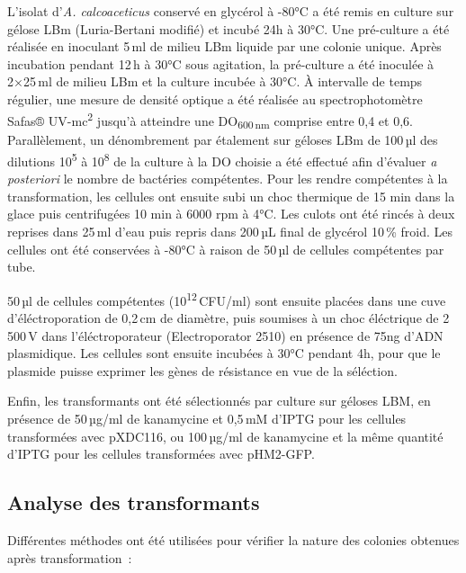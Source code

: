 L’isolat d’\textit{A. calcoaceticus} conservé en glycérol à -80°C a été remis en culture sur gélose LBm (Luria-Bertani modifié) et incubé 24h à 30°C.
Une pré-culture a été réalisée en inoculant 5\,ml de milieu LBm liquide par une colonie unique.
Après incubation pendant 12\,h à 30°C sous agitation, la pré-culture a été inoculée à 2×25\,ml de milieu LBm et la culture incubée à 30°C.
À intervalle de temps régulier, une mesure de densité optique a été réalisée au spectrophotomètre Safas® UV-mc\textsuperscript{2} jusqu’à atteindre une DO\textsubscript{600\,nm} comprise entre 0,4 et 0,6.
Parallèlement, un dénombrement par étalement sur géloses LBm de 100\,µl des dilutions 10\textsuperscript{5} à 10\textsuperscript{8} de la culture à la DO choisie a été effectué afin d’évaluer \textit{a posteriori} le nombre de bactéries compétentes.
Pour les rendre compétentes à la transformation, les cellules ont ensuite subi un choc thermique de 15 min dans la glace puis centrifugées 10 min à 6000 rpm à 4°C. 
Les culots ont été rincés à deux reprises dans 25\,ml d'eau puis repris dans 200\,µL final de glycérol 10\,\% froid.
Les cellules ont été conservées à -80°C à raison de 50\,µl de cellules compétentes par tube.

50\,µl de cellules compétentes (10\textsuperscript{12}\,CFU/ml) sont ensuite placées dans une cuve d'éléctroporation de 0,2\,cm de diamètre, puis soumises à un choc éléctrique de 2\,500\,V dans l’éléctroporateur (Electroporator 2510) en présence de 75ng d’ADN plasmidique.
Les cellules sont ensuite incubées à 30°C pendant 4h, pour que le plasmide puisse exprimer les gènes de résistance en vue de la séléction.

Enfin, les transformants ont été sélectionnés par culture sur géloses LBM, en présence de 50\,µg/ml de kanamycine et 0,5\,mM d’IPTG pour les cellules transformées avec pXDC116, ou 100\,µg/ml de kanamycine et la même quantité d'IPTG pour les cellules transformées avec pHM2-GFP.

\subsection{Analyse des transformants}

Différentes méthodes ont été utilisées pour vérifier la nature des colonies obtenues après transformation~:
